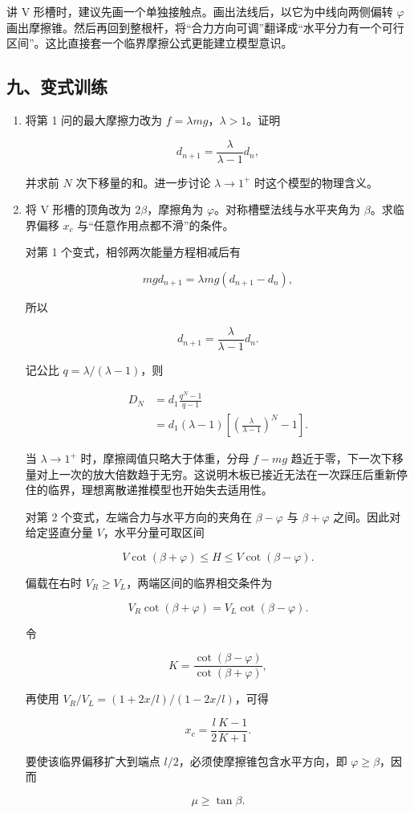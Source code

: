 \documentclass[12pt,a4paper,UTF8]{ctexart}
\begin{document}
讲 V 形槽时，建议先画一个单独接触点。画出法线后，以它为中线向两侧偏转
\(\varphi\)
画出摩擦锥。然后再回到整根杆，将``合力方向可调''翻译成``水平分力有一个可行区间''。这比直接套一个临界摩擦公式更能建立模型意识。

\subsection{九、变式训练}\label{ux4e5dux53d8ux5f0fux8badux7ec3}

\begin{enumerate}
\def\labelenumi{\arabic{enumi}.}
\item
  将第 1 问的最大摩擦力改为 \(f=\lambda mg\)，\(\lambda>1\)。证明

  \[d_{n+1}=\frac{\lambda}{\lambda-1}d_n,\]

  并求前 \(N\) 次下移量的和。进一步讨论 \(\lambda\to1^+\)
  时这个模型的物理含义。
\item
  将 V 形槽的顶角改为 \(2\beta\)，摩擦角为
  \(\varphi\)。对称槽壁法线与水平夹角为 \(\beta\)。求临界偏移 \(x_c\)
  与``任意作用点都不滑''的条件。

  对第 1 个变式，相邻两次能量方程相减后有

  \[
  mgd_{n+1}=\lambda mg(d_{n+1}-d_n),
  \]

  所以

  \[
  d_{n+1}=\frac{\lambda}{\lambda-1}d_n.
  \]

  记公比 \(q=\lambda/(\lambda-1)\)，则

  \[
  \begin{aligned}
  D_N
  &=d_1\frac{q^N-1}{q-1}\\
  &=d_1(\lambda-1)
  \left[\left(\frac{\lambda}{\lambda-1}\right)^N-1\right].
  \end{aligned}
  \]

  当 \(\lambda\to1^+\) 时，摩擦阈值只略大于体重，分母 \(f-mg\)
  趋近于零，下一次下移量对上一次的放大倍数趋于无穷。这说明木板已接近无法在一次踩压后重新停住的临界，理想离散递推模型也开始失去适用性。

  对第 2 个变式，左端合力与水平方向的夹角在 \(\beta-\varphi\) 与
  \(\beta+\varphi\) 之间。因此对给定竖直分量 \(V\)，水平分量可取区间

  \[
  V\cot(\beta+\varphi)
  \le H\le
  V\cot(\beta-\varphi).
  \]

  偏载在右时 \(V_R\ge V_L\)，两端区间的临界相交条件为

  \[
  V_R\cot(\beta+\varphi)
  =V_L\cot(\beta-\varphi).
  \]

  令

  \[
  K=\frac{\cot(\beta-\varphi)}
  {\cot(\beta+\varphi)},
  \]

  再使用 \(V_R/V_L=(1+2x/l)/(1-2x/l)\)，可得

  \[
  \boxed{x_c=\frac l2\frac{K-1}{K+1}}.
  \]

  要使该临界偏移扩大到端点 \(l/2\)，必须使摩擦锥包含水平方向，即
  \(\varphi\ge\beta\)，因而

  \[
  \boxed{\mu\ge\tan\beta}.
  \]
\end{enumerate}
\end{document}
